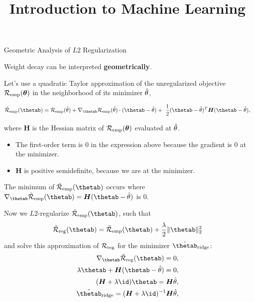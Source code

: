 \documentclass[11pt,compress,t,notes=noshow, xcolor=table]{beamer}
\title{Introduction to Machine Learning}
\date{}
\begin{document}

\begin{vbframe}{Geometric Analysis of $L2$ Regularization}

Weight decay can be interpreted \textbf{geometrically}. 

\lz 

Let's use a quadratic Taylor approximation of the unregularized objective $\mathcal{R}_{\text{emp}}(\bm{\theta})$ in the neighborhood of its minimizer $\hat{\theta}$,  

$$ \mathcal{\tilde R}_{\text{emp}}(\thetab)= \mathcal{R}_{\text{emp}}(\thetah) + \nabla_{\thetab} \mathcal{R}_{\text{emp}}(\thetah)\cdot(\thetab - \thetah) + \ \frac{1}{2} (\thetab - \thetah)^T \bm{H} (\thetab - \thetah), $$

where $\bm{H}$ is the Hessian matrix of $\mathcal{R}_{\text{emp}}(\bm{\theta})$ evaluated at $\hat{\theta}$. 

\lz

\begin{itemize}
  \item The first-order term is 0 in the expression above because the gradient is $0$ at the minimizer.
  \item $\bm{H}$ is positive semidefinite, because we are at the minimizer.
\end{itemize}

\lz

\framebreak

\normalsize

The minimum of $\mathcal{\tilde R}_{\text{emp}}(\thetab)$ occurs where $\nabla_{\thetab}\mathcal{\tilde R}_{\text{emp}}(\thetab) = \bm{H}(\thetab - \thetah)$ is $0$.

Now we $L2$-regularize $\mathcal{\tilde R}_{\text{emp}}(\thetab)$, such that 
\[
\mathcal{\tilde R}_{\text{reg}}(\thetab) = \mathcal{\tilde R}_{\text{emp}}(\thetab) + \frac{\lambda}{2} \|\thetab\|^2_2\]
and solve this approximation of $\mathcal{R}_{\text{reg}}$ for the minimizer $\hat{\thetab}_{\text{ridge}}$:
\begin{align*}
 \nabla_{\thetab}\mathcal{\tilde R}_{\text{reg}}(\thetab) = 0,\\
  \lambda \thetab + \bm{H}(\thetab - \thetah) = 0,\\
      (\bm{H} + \lambda \id) \thetab = \bm{H} \thetah,\\
      \hat{\thetab}_{\text{ridge}} = (\bm{H} + \lambda \id)^{-1}\bm{H} \thetah,
\end{align*}


\end{vbframe}
\end{document}
